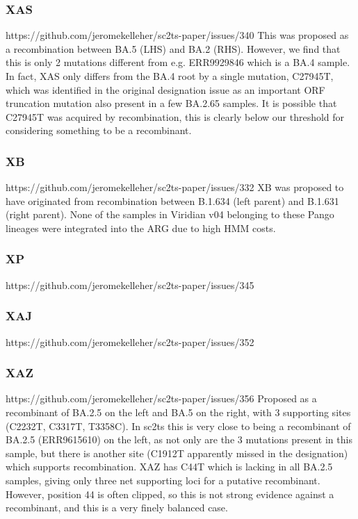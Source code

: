 \documentclass[12pt,letterpaper]{article}
\begin{document}
\subsubsection*{XAS}
https://github.com/jeromekelleher/sc2ts-paper/issues/340
This was proposed as a recombination between BA.5 (LHS) and BA.2 (RHS).
However, we find that this is only 2 mutations different from e.g. ERR9929846 which is a BA.4 sample.
In fact, XAS only differs from the BA.4 root by a single mutation, C27945T,
which was identified in the original designation issue as an important ORF truncation mutation also present in a few BA.2.65 samples.
It is possible that C27945T was acquired by recombination, this is clearly below our threshold for considering something to be a recombinant.

\subsubsection*{XB}
https://github.com/jeromekelleher/sc2ts-paper/issues/332
XB was proposed to have originated from recombination between B.1.634 (left parent) and B.1.631 (right parent).
None of the samples in Viridian v04 belonging to these Pango lineages were integrated into the ARG due to high HMM costs.

\subsubsection*{XP}
https://github.com/jeromekelleher/sc2ts-paper/issues/345

\subsubsection*{XAJ}
https://github.com/jeromekelleher/sc2ts-paper/issues/352

\subsubsection*{XAZ}
https://github.com/jeromekelleher/sc2ts-paper/issues/356
Proposed as a recombinant of BA.2.5 on the left and BA.5 on the right, with 3 supporting sites (C2232T, C3317T, T3358C).
In sc2ts this is very close to being a recombinant of BA.2.5 (ERR9615610) on the left,
as not only are the 3 mutations present in this sample,
but there is another site (C1912T apparently missed in the designation) which supports recombination.
XAZ has C44T which is lacking in all BA.2.5 samples,
giving only three net supporting loci for a putative recombinant.
However, position 44 is often clipped, so this is not strong evidence against a recombinant, and
this is a very finely balanced case.
\end{document}
